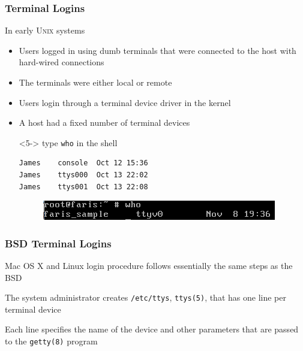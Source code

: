 \documentclass[newPxFont,sthlmFooter,nooffset]{beamer}
\begin{document}
\begin{frame}[fragile,t]
  \frametitle{Terminal Logins}
In early \textsc{Unix} systems
\begin{itemize}
\item <1-> Users logged in using dumb terminals that were connected to the host with hard-wired connections
\item <2-> The terminals were either local or remote
\item <3-> Users login through a terminal device driver in the kernel
\item <4-> A host had a fixed number of terminal devices

\item [ ] <5-> type \texttt{who} in the shell
\begin{verbatim}
James    console  Oct 12 15:36
James    ttys000  Oct 13 22:02
James    ttys001  Oct 13 22:08
\end{verbatim}
\begin{figure}[h]
  \centering
  \includegraphics[width=0.8\linewidth]{figure/GambarWho.png}
\end{figure}
\end{itemize}
\end{frame}


\begin{frame}[t]
  \frametitle{BSD Terminal Logins}

Mac OS X and Linux login procedure follows essentially the same steps as the BSD

The system administrator creates \texttt{/etc/ttys}, \texttt{ttys(5)}, that has one line per terminal device

Each line specifies the name of the device and other parameters that are passed to the \texttt{getty(8)} program
\end{frame}
\end{document}
